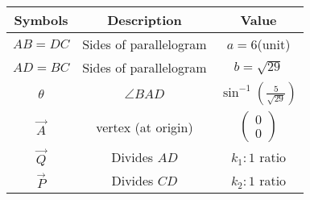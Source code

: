 \begin{tabular}{|c|c|c|}
\hline
    \textbf{Symbols} &\textbf{Description}&\textbf{Value} \\
    \hline
     $AB = DC$& Sides of parallelogram &$a = 6$(unit)\\
     \hline
     $AD = BC$& Sides of parallelogram &$b = \sqrt{29}$\\
     \hline
     
     $\theta$& $\angle BAD $& $\sin^{-1}(\frac{5}{\sqrt{29}})$\\
     \hline
     $\vec{A}$& vertex (at origin) &$\begin{pmatrix}
     0\\0
     \end{pmatrix}$\\
     \hline
     $\vec{ Q}$& Divides $AD$ &$k_1:1$ ratio\\
     \hline
      $\vec{P}$& Divides $CD$ &$k_2:1$ ratio\\
     \hline  
\end{tabular}
